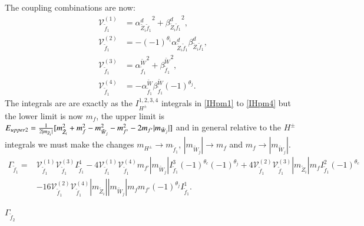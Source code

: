 \documentclass[final,3p,times]{elsarticle}
\begin{document}
The coupling combinations are now:
\begin{align}
\mathcal{V}_{\tilde{f}_1}^{(1)} &= {\alpha_{\tilde{Z}_i \tilde{f}_1}^{d}}^2 + {\beta_{\tilde{Z}_i \tilde{f}_1}^{d}}^2, \\
\mathcal{V}_{\tilde{f}_1}^{(2)} &= -(-1)^{\theta_i}{\alpha_{\tilde{Z}_i \tilde{f}_1}^{d}} {\beta_{\tilde{Z}_i \tilde{f}_1}^{d}}, \\
\mathcal{V}_{\tilde{f}_1}^{(3)} &= {\alpha_{\tilde{f}_1}^{\tilde{W}}}^2 + {\beta_{\tilde{f}_1}^{\tilde{W}}}^2, \\
\mathcal{V}_{\tilde{f}_1}^{(4)} &= -\alpha_{\tilde{f}_1}^{\tilde{W}} \beta_{\tilde{f}_1}^{\tilde{W}}(-1)^{\theta_j}.
\end{align}
The integrals are are exactly as the $I_{H^{\pm}}^{1,2,3,4}$ integrals in \eqref{IHpm1} to \eqref{IHpm4} but the lower limit is now $m_{f}$, the upper limit is $E_{upper2} = {1 \over 2|m_{\tilde{Z}_i}|}[m_{\tilde{Z}_i}^2 + m_{f}^2 - m_{\tilde{W}_j}^2 - m_{f'}^2 - 2m_{f'}|m_{\tilde{W}_j}|]$ and in general relative to the $H^{\pm}$ integrals we must make the changes $m_{H^{\pm}} \rightarrow m_{\tilde{f}_1}$, $|m_{\tilde{W}_j}| \rightarrow m_{f}$ and $m_f \rightarrow |m_{\tilde{W}_j}|$.
\begin{equation}
\begin{aligned}
\Gamma_{\tilde{f}_1} = & \mathcal{V}_{\tilde{f}_1}^{(1)} \mathcal{V}_{\tilde{f}_1}^{(3)} I_{\tilde{f}_1}^{4} - 4 \mathcal{V}_{\tilde{f}_1}^{(1)} \mathcal{V}_{\tilde{f}_1}^{(4)} m_{f'} |m_{\tilde{W}_j}| I_{\tilde{f}_1}^{3} (-1)^{\theta_c}(-1)^{\theta_j} + 4 \mathcal{V}_{\tilde{f}_1}^{(2)} \mathcal{V}_{\tilde{f}_1}^{(3)} |m_{\tilde{Z}_i}|m_{f} I_{\tilde{f}_1}^{2}(-1)^{\theta_c} \\ & - 16 \mathcal{V}_{\tilde{f}_1}^{(2)}  \mathcal{V}_{\tilde{f}_1}^{(4)} |m_{\tilde{Z}_i}||m_{\tilde{W}_j}|m_{f}m_{f'}(-1)^{\theta_j}I_{\tilde{f}_1}^{1}.
\end{aligned}
\end{equation}

\textbf{\underline{$\Gamma_{\tilde{f}_2}$}}
\end{document}
